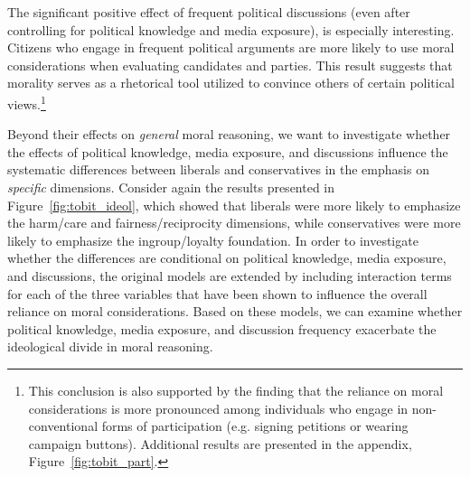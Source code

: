 \documentclass[12pt]{article}
\begin{document}
The significant positive effect of frequent political discussions (even after controlling for political knowledge and media exposure), is especially interesting. Citizens who engage in frequent political arguments are more likely to use moral considerations when evaluating candidates and parties. This result suggests that morality serves as a rhetorical tool utilized to convince others of certain political views.\footnote{This conclusion is also supported by the finding that the reliance on moral considerations is more pronounced among individuals who engage in non-conventional forms of participation (e.g. signing petitions or wearing campaign buttons). Additional results are presented in the appendix, Figure~\ref{fig:tobit_part}.}

Beyond their effects on \textit{general} moral reasoning, we want to investigate whether the effects of political knowledge, media exposure, and discussions influence the systematic differences between liberals and conservatives in the emphasis on \textit{specific} dimensions. Consider again the results presented in Figure~\ref{fig:tobit_ideol}, which showed that liberals were more likely to emphasize the harm/care and fairness/reciprocity dimensions, while conservatives were more likely to emphasize the ingroup/loyalty foundation. In order to investigate whether the differences are conditional on political knowledge, media exposure, and discussions, the original models are extended by including interaction terms for each of the three variables that have been shown to influence the overall reliance on moral considerations. Based on these models, we can examine whether political knowledge, media exposure, and discussion frequency exacerbate the ideological divide in moral reasoning.
\end{document}
